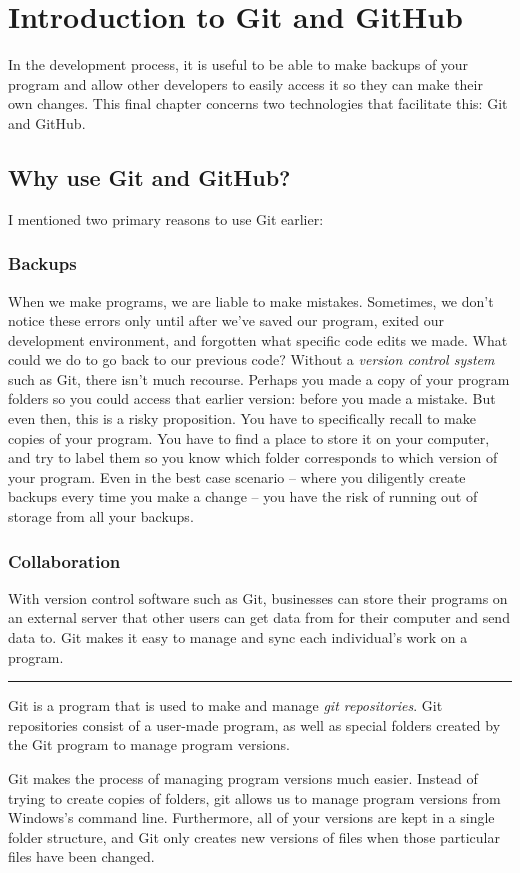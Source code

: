 \documentclass[oneside, openany] {book}
\begin{document}
\chapter{Introduction to Git and GitHub}
\minitoc
In the development process, it is useful to be able to make backups of your program and allow other developers to easily access it so they can make their own changes. This final chapter concerns two technologies that facilitate this: Git and GitHub.

\section{Why use Git and GitHub?}
I mentioned two primary reasons to use Git earlier:
\subsection{Backups}
When we make programs, we are liable to make mistakes. Sometimes, we don't notice these errors only until after we've saved our program, exited our development environment, and forgotten what specific code edits we made. What could we do to go back to our previous code?
Without a \emph{version control system} such as Git, there isn't much recourse. Perhaps you made a copy of your program folders so you could access that earlier version: before you made a mistake. But even then, this is a risky proposition. You have to specifically recall to make copies of your program. You have to find a place to store it on your computer, and try to label them so you know which folder corresponds to which version of your program. Even in the best case scenario -- where you diligently create backups every time you make a change -- you have the risk of running out of storage from all your backups.
\subsection{Collaboration}
With version control software such as Git, businesses can store their programs on an external server that other users can get data from for their computer and send data to. Git makes it easy to manage and sync each individual's work on a program.

\noindent\rule{12.5cm}{0.4pt}
Git is a program that is used to make and manage \emph{git repositories}. Git repositories consist of a user-made program, as well as special folders created by the Git program to manage program versions.

Git makes the process of managing program versions much easier. Instead of trying to create copies of folders, git allows us to manage program versions from Windows's command line. Furthermore, all of your versions are kept in a single folder structure, and Git only creates new versions of files when those particular files have been changed.
\end{document}
